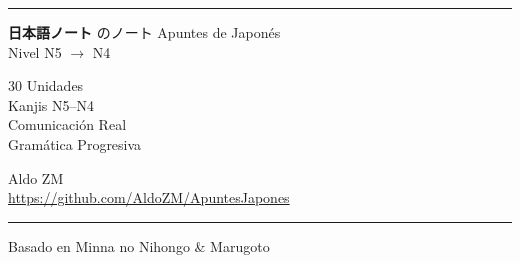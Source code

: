 \begin{titlepage}
  \begin{center}
    \vspace*{1.5cm}
    {\color{jpred}\rule{\linewidth}{3pt}}
    \vspace{1cm}
    {\fontsize{60}{70}\selectfont {}}
    \vspace{0.5cm}
    {\Huge\bfseries\color{jpred} 日本語ノート}
    \vspace{0.3cm}
    {\Large\color{jpblue} のノート}
    \vspace{0.5cm}
    {\large Apuntes de Japonés} \\[0.3em]
    {\large\color{darkgray} Nivel N5 $\to$ N4}
    \vspace{1cm}
    \begin{tcolorbox}[width=0.65\linewidth, colback=jpgold!10, colframe=jpgold!70!black, rounded corners, halign=center]
    \large
     30 Unidades \\[4pt]
     Kanjis N5--N4 \\[4pt]
     Comunicación Real \\[4pt]
     Gramática Progresiva
    \end{tcolorbox}
    \vspace{1cm}
    {\large Aldo ZM} \\[0.3em]
    {\small\color{darkgray}\url{https://github.com/AldoZM/ApuntesJapones}}
    \vfill
    {\color{jpred}\rule{\linewidth}{3pt}}
    {\small\color{darkgray} Basado en Minna no Nihongo \& Marugoto}
  \end{center}
\end{titlepage}